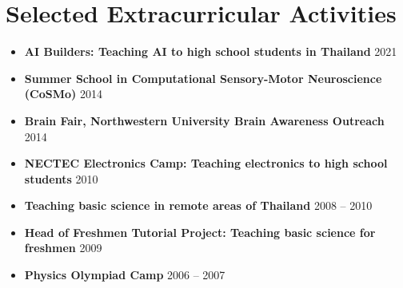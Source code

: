 \section{\sc Selected Extracurricular Activities}

\begin{itemize}[leftmargin=0cm, label={}]

\item {\bf AI Builders: Teaching AI to high school students in Thailand} \hfill 2021

\item {\bf Summer School in Computational Sensory-Motor Neuroscience (CoSMo)} \hfill 2014

\item{\bf Brain Fair, Northwestern University Brain Awareness Outreach} \hfill 2014

\item {\bf NECTEC Electronics Camp: Teaching electronics to high school students} \hfill 2010

\item {\bf Teaching basic science in remote areas of Thailand}	\hfill 2008 -- 2010

\item {\bf Head of Freshmen Tutorial Project: Teaching basic science for freshmen} \hfill 2009

\item {\bf Physics Olympiad Camp} \hfill 2006 -- 2007

\end{itemize}